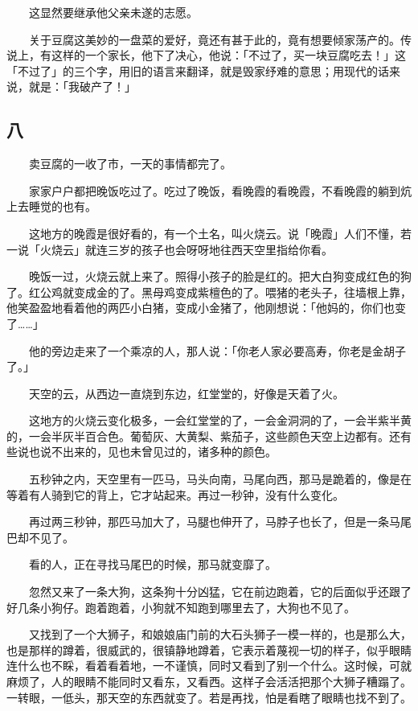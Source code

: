 \documentclass[UTF8]{ctexart}
\begin{document}
　　这显然要继承他父亲未遂的志愿。

　　关于豆腐这美妙的一盘菜的爱好，竟还有甚于此的，竟有想要倾家荡产的。传说上，有这样的一个家长，他下了决心，他说：「不过了，买一块豆腐吃去！」这「不过了」的三个字，用旧的语言来翻译，就是毁家纾难的意思；用现代的话来说，就是：「我破产了！」

\subsection{八}

　　卖豆腐的一收了市，一天的事情都完了。

　　家家户户都把晚饭吃过了。吃过了晚饭，看晚霞的看晚霞，不看晚霞的躺到炕上去睡觉的也有。

　　这地方的晚霞是很好看的，有一个土名，叫火烧云。说「晚霞」人们不懂，若一说「火烧云」就连三岁的孩子也会呀呀地往西天空里指给你看。

　　晚饭一过，火烧云就上来了。照得小孩子的脸是红的。把大白狗变成红色的狗了。红公鸡就变成金的了。黑母鸡变成紫檀色的了。喂猪的老头子，往墙根上靠，他笑盈盈地看着他的两匹小白猪，变成小金猪了，他刚想说：「他妈的，你们也变了……」

　　他的旁边走来了一个乘凉的人，那人说：「你老人家必要高寿，你老是金胡子了。」

　　天空的云，从西边一直烧到东边，红堂堂的，好像是天着了火。

　　这地方的火烧云变化极多，一会红堂堂的了，一会金洞洞的了，一会半紫半黄的，一会半灰半百合色。葡萄灰、大黄梨、紫茄子，这些颜色天空上边都有。还有些说也说不出来的，见也未曾见过的，诸多种的颜色。

　　五秒钟之内，天空里有一匹马，马头向南，马尾向西，那马是跪着的，像是在等着有人骑到它的背上，它才站起来。再过一秒钟，没有什么变化。

　　再过两三秒钟，那匹马加大了，马腿也伸开了，马脖子也长了，但是一条马尾巴却不见了。

　　看的人，正在寻找马尾巴的时候，那马就变靡了。

　　忽然又来了一条大狗，这条狗十分凶猛，它在前边跑着，它的后面似乎还跟了好几条小狗仔。跑着跑着，小狗就不知跑到哪里去了，大狗也不见了。

　　又找到了一个大狮子，和娘娘庙门前的大石头狮子一模一样的，也是那么大，也是那样的蹲着，很威武的，很镇静地蹲着，它表示着蔑视一切的样子，似乎眼睛连什么也不睬，看着看着地，一不谨慎，同时又看到了别一个什么。这时候，可就麻烦了，人的眼睛不能同时又看东，又看西。这样子会活活把那个大狮子糟蹋了。一转眼，一低头，那天空的东西就变了。若是再找，怕是看瞎了眼睛也找不到了。
\end{document}
